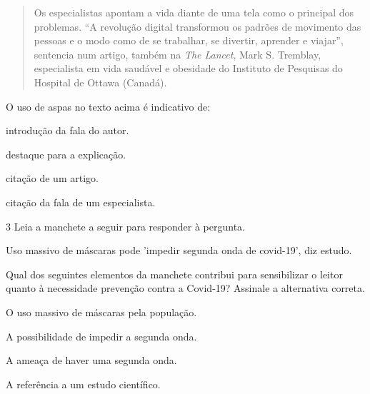 \begin{quote}

Os especialistas apontam a vida diante de uma tela como o principal dos
problemas. ``A revolução digital transformou os padrões de movimento das
pessoas e o modo como de se trabalhar, se divertir, aprender e viajar'',
sentencia num artigo, também na \textit{The Lancet}, Mark S. Tremblay,
especialista em vida saudável e obesidade do Instituto de Pesquisas do
Hospital de Ottawa (Canadá).

\end{quote}


O uso de aspas no texto acima é indicativo de:

\begin{escolha}

  \item introdução da fala do autor.

  \item destaque para a explicação.

  \item citação de um artigo.

  \item citação da fala de um especialista.

\end{escolha}


\num{3} Leia a manchete a seguir para responder à pergunta. 

Uso massivo de máscaras pode 'impedir segunda onda de covid-19', diz
estudo.


Qual dos seguintes elementos da manchete contribui para sensibilizar o leitor 
quanto à necessidade prevenção contra a Covid-19? Assinale a alternativa correta.

\begin{escolha}

  \item O uso massivo de máscaras pela população.

  \item A possibilidade de impedir a segunda onda.

  \item A ameaça de haver uma segunda onda.

  \item A referência a um estudo científico.

\end{escolha}


